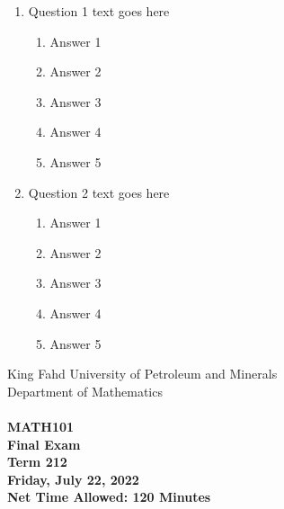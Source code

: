 \documentclass[amsfonts,bezier,leqno,fleqn,12pt,a4paper]{article}
\begin{document}
\newpage


\renewcommand{\thepage}{\noindent Term Term 212, MATH101, Final Exam \hfill Page {\bf \arabic{page} of 1 } \hfill {\bf \fbox{ MASTER }}}
\setcounter{page}{1}


\begin{large}
\begin{enumerate}

\item Question 1 text goes here
\vspace {0.3in}
\setcounter{equation}{0}

\begin{enumerate}
\item Answer 1
\item Answer 2
\item Answer 3
\item Answer 4
\item Answer 5

\end{enumerate}

\vspace {3.5cm}


\item Question 2 text goes here
\vspace {0.3in}
\setcounter{equation}{0}

\begin{enumerate}
\item Answer 1
\item Answer 2
\item Answer 3
\item Answer 4
\item Answer 5

\end{enumerate}
\newpage


\end{enumerate}
\end{large}



\newpage


\thispagestyle{empty}
\begin{center}
    \begin{large}
        King Fahd University of Petroleum and Minerals \\ 
        Department of Mathematics  \\ 
        \vspace*{4.5cm}
        {\bf {} }  \hfill {\bf {}} \\
        {\bf MATH101 }  \\
        {\bf Final Exam }  \\
        {\bf Term 212 }  \\
        {\bf Friday, July 22, 2022 }  \\ 
        {\bf Net Time Allowed: 120 Minutes }  \\
        \vspace*{0.2cm}

    \end{large}
\end{center}
\end{document}

